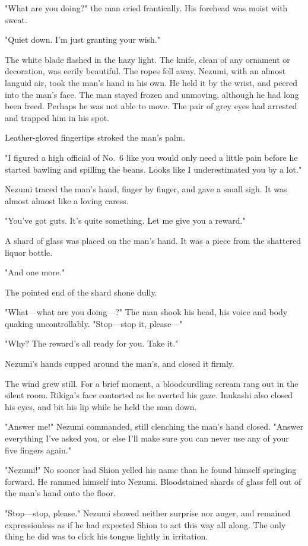 "What are you doing?" the man cried frantically. His forehead was moist
with sweat.

"Quiet down. I'm just granting your wish."

The white blade flashed in the hazy light. The knife, clean of any
ornament or decoration, was eerily beautiful. The ropes fell away.
Nezumi, with an almost languid air, took the man's hand in his own. He
held it by the wrist, and peered into the man's face. The man stayed
frozen and unmoving, although he had long been freed. Perhaps he was not
able to move. The pair of grey eyes had arrested and trapped him in his
spot.

Leather-gloved fingertips stroked the man's palm.

"I figured a high official of No.~6 like you would only need a little
pain before he started bawling and spilling the beans. Looks like I
underestimated you by a lot."

Nezumi traced the man's hand, finger by finger, and gave a small sigh.
It was almost almost like a loving caress.

"You've got guts. It's quite something. Let me give you a reward."

A shard of glass was placed on the man's hand. It was a piece from the
shattered liquor bottle.

"And one more."

The pointed end of the shard shone dully.

"What---what are you doing---?" The man shook his head, his voice and body
quaking uncontrollably. "Stop---stop it, please---"

"Why? The reward's all ready for you. Take it."

Nezumi's hands cupped around the man's, and closed it firmly.

The wind grew still. For a brief moment, a bloodcurdling scream rang out
in the silent room. Rikiga's face contorted as he averted his gaze.
Inukashi also closed his eyes, and bit his lip while he held the man
down.

"Answer me!" Nezumi commanded, still clenching the man's hand closed.
"Answer everything I've asked you, or else I'll make sure you can never
use any of your five fingers again."

"Nezumi!" No sooner had Shion yelled his name than he found himself
springing forward. He rammed himself into Nezumi. Bloodstained shards of
glass fell out of the man's hand onto the floor.

"Stop---stop, please." Nezumi showed neither surprise nor anger, and
remained expressionless as if he had expected Shion to act this way all
along. The only thing he did was to click his tongue lightly in
irritation.

